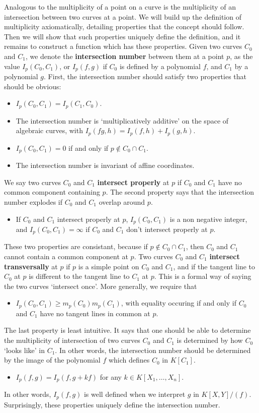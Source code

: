 Analogous to the multiplicity of a point on a curve is the multiplicity of an intersection between two curves at a point. We will build up the definition of multiplicity axiomatically, detailing properties that the concept should follow. Then we will show that such properties uniquely define the definition, and it remains to construct a function which has these properties. Given two curves $C_0$ and $C_1$, we denote the {\bf intersection number} between them at a point $p$, as the value $I_p(C_0,C_1)$, or $I_p(f,g)$ if $C_0$ is defined by a polynomial $f$, and $C_1$ by a polynomial $g$. First, the intersection number should satisfy two properties that should be obvious:
%
\begin{itemize}
    \item $I_p(C_0,C_1) = I_p(C_1,C_0)$.
    \item The intersection number is `multiplicatively additive' on the space of algebraic curves, with $I_p(fg,h) = I_p(f,h) + I_p(g,h)$.
    \item $I_p(C_0,C_1) = 0$ if and only if $p \not \in C_0 \cap C_1$.
    \item The intersection number is invariant of affine coordinates.
\end{itemize}
%
We say two curves $C_0$ and $C_1$ {\bf intersect properly} at $p$ if $C_0$ and $C_1$ have no common component containing $p$. The second property says that the intersection number explodes if $C_0$ and $C_1$ overlap around $p$.
%
\begin{itemize}
    \item If $C_0$ and $C_1$ intersect properly at $p$, $I_p(C_0,C_1)$ is a non negative integer, and $I_p(C_0,C_1) = \infty$ if $C_0$ and $C_1$ don't intersect properly at $p$.
\end{itemize}
%
These two properties are consistant, because if $p \not \in C_0 \cap C_1$, then $C_0$ and $C_1$ cannot contain a common component at $p$. Two curves $C_0$ and $C_1$ {\bf intersect transversally} at $p$ if $p$ is a simple point on $C_0$ and $C_1$, and if the tangent line to $C_0$ at $p$ is different to the tangent line to $C_1$ at $p$. This is a formal way of saying the two curves `intersect once'. More generally, we require that
%
\begin{itemize}
    \item $I_p(C_0,C_1) \geq m_p(C_0) m_p(C_1)$, with equality occuring if and only if $C_0$ and $C_1$ have no tangent lines in common at $p$.
\end{itemize}
%
The last property is least intuitive. It says that one should be able to determine the multiplicity of intersection of two curves $C_0$ and $C_1$ is determined by how $C_0$ `looks like' in $C_1$. In other words, the intersection number should be determined by the image of the polynomial $f$ which defines $C_0$ in $K[C_1]$.
%
\begin{itemize}
    \item $I_p(f,g) = I_p(f,g + kf)$ for any $k \in K[X_1, \dots, X_n]$.
\end{itemize}
%
In other words, $I_p(f,g)$ is well defined when we interpret $g$ in $K[X,Y]/(f)$. Surprisingly, these properties uniquely define the intersection number.

